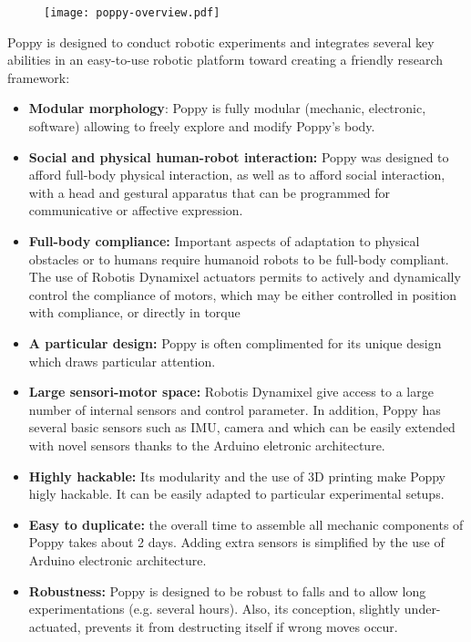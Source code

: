 \begin{figure}[tb]
    \begin{center}
        \texttt{[image: poppy-overview.pdf]}
    \end{center}
    \caption{}
    \label{fig:poppyv0.1_overview}
\end{figure}

Poppy is designed to conduct robotic experiments and integrates several key abilities in an easy-to-use robotic platform toward creating a friendly research framework:
\begin{itemize}
    \item \textbf{Modular morphology}: Poppy is fully modular (mechanic, electronic, software) allowing to freely explore and modify Poppy's body.
    \item \textbf{Social and physical human-robot interaction:} Poppy was designed to afford full-body physical interaction, as well as to afford social interaction, with a head and gestural apparatus that can be programmed for communicative or affective expression.
    \item \textbf{Full-body compliance:} Important aspects of adaptation to physical obstacles or to humans require humanoid robots to be full-body compliant. The use of Robotis Dynamixel actuators permits to actively and dynamically control the compliance of motors, which may be either controlled in position with compliance, or directly in torque
    \item \textbf{A particular design:} Poppy is often complimented for its unique design which draws particular attention.
    \item \textbf{Large sensori-motor space:} Robotis Dynamixel give access to a large number of internal sensors and control parameter. In addition, Poppy has several basic sensors such as IMU, camera and which can be easily extended with novel sensors thanks to the Arduino eletronic architecture.
    \item \textbf{Highly hackable:} Its modularity and the use of 3D printing make Poppy higly hackable. It can be easily adapted to particular experimental setups.
    \item \textbf{Easy to duplicate:} the overall time to assemble all mechanic components of Poppy takes about 2 days. Adding extra sensors is simplified by the use of Arduino electronic architecture.
    \item \textbf{Robustness:} Poppy is designed to be robust to falls and to allow long experimentations (e.g. several hours). Also, its conception, slightly under-actuated, prevents it from destructing itself if wrong moves occur.

\end{itemize}
